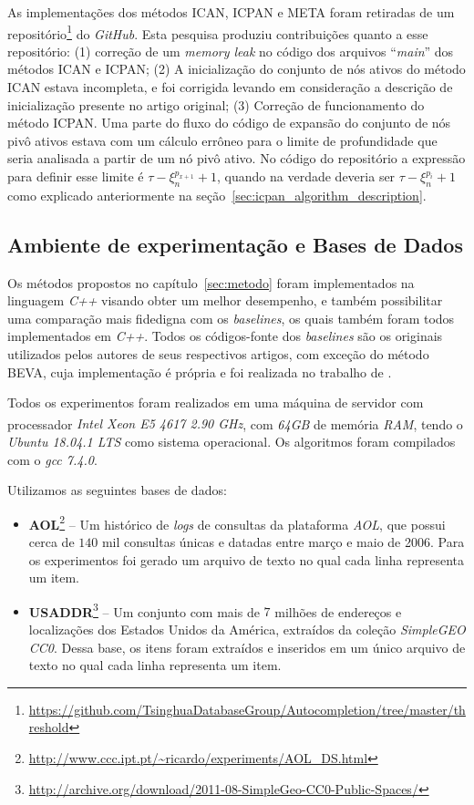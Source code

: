 As implementações dos métodos ICAN, ICPAN e META foram retiradas de um repositório\footnote{\url{https://github.com/TsinghuaDatabaseGroup/Autocompletion/tree/master/threshold}} do \textit{GitHub}. Esta pesquisa produziu contribuições quanto a esse repositório: (1) correção de um \textit{memory leak} no código dos arquivos ``\textit{main}'' dos métodos ICAN e ICPAN; (2) A inicialização do conjunto de nós ativos do método ICAN estava incompleta, e foi corrigida levando em consideração a descrição de inicialização presente no artigo original; (3) Correção de funcionamento do método ICPAN. Uma parte do fluxo do código de expansão do conjunto de nós pivô ativos estava com um cálculo errôneo para o limite de profundidade que seria analisada a partir de um nó pivô ativo. No código do repositório a expressão para definir esse limite é $\tau - \xi_{n}^{p_{x+1}} + 1$, quando na verdade deveria ser $\tau - \xi_{n}^{p_{i}} + 1$ como explicado anteriormente na seção~\ref{sec:icpan_algorithm_description}. 

\subsection{Ambiente de experimentação e Bases de Dados}

Os métodos propostos no capítulo~\ref{sec:metodo} foram implementados na linguagem \textit{C++} visando obter um melhor desempenho, e também possibilitar uma comparação mais fidedigna com os \textit{baselines}, os quais também foram todos implementados em \textit{C++}. Todos os códigos-fonte dos \textit{baselines} são os originais utilizados pelos autores de seus respectivos artigos, com exceção do método BEVA, cuja implementação é própria e foi realizada no trabalho de \cite{berg2020}.

Todos os experimentos foram realizados em uma máquina de servidor com processador \textit{Intel \textsuperscript{\textregistered} Xeon E5 4617 2.90 GHz}, com \textit{64GB} de memória \textit{RAM}, tendo o \textit{Ubuntu 18.04.1 LTS} como sistema operacional. Os algoritmos foram compilados com o \textit{gcc 7.4.0}.

Utilizamos as seguintes bases de dados:

\begin{itemize}
    \item \textbf{AOL}\footnote{\url{http://www.ccc.ipt.pt/~ricardo/experiments/AOL_DS.html}} -- Um histórico de \textit{logs} de consultas da plataforma \textit{AOL}, que possui cerca de $140$ mil consultas únicas e datadas entre março e maio de 2006. Para os experimentos foi gerado um arquivo de texto no qual cada linha representa um item. 
    \item \textbf{USADDR}\footnote{\url{http://archive.org/download/2011-08-SimpleGeo-CC0-Public-Spaces/}} -- Um conjunto com mais de $7$ milhões de endereços e localizações dos Estados Unidos da América, extraídos da coleção \textit{SimpleGEO CC0}. Dessa base, os itens foram extraídos e inseridos em um único arquivo de texto no qual cada linha representa um item.    
\end{itemize} 
 

